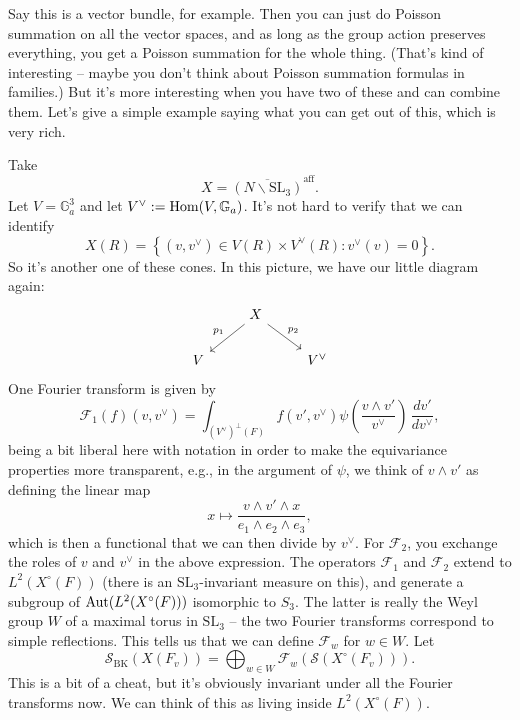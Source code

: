 \documentclass[reqno]{amsart} 
\numberwithin{theorem}{section}
\numberwithin{equation}{section}
\numberwithin{exercise}{section}
\begin{document}
Say this is a vector bundle, for example.  Then you can just do Poisson summation on all the vector spaces, and as long as the group action preserves everything, you get a Poisson summation for the whole thing.  (That's kind of interesting -- maybe you don't think about Poisson summation formulas in families.)  But it's more interesting when you have two of these and can combine them.  Let's give a simple example saying what you can get out of this, which is very rich.

\begin{example}
   Take
   \begin{equation*}
    X = \overline{(N \backslash \mathrm{SL}_3)}^{\mathrm{aff}}.
  \end{equation*}
  Let $V = \mathbb{G}_a^3$ and let $V^\vee := \operatorname{Hom}(V, \mathbb{G}_a)$.  It's not hard to verify that we can identify
  \begin{equation*}
    X(R) = \left\{(v, v^\vee) \in V(R) \times V^\vee(R) : v^\vee(v) = 0 \right\}.
  \end{equation*}
  So it's another one of these cones.  In this picture, we have our little diagram again:
  \begin{equation*}
    \begin{tikzcd}
      & X \arrow[dl, "p_1"'] \arrow[dr, "p_2"] & \\
      V & & V^\vee
    \end{tikzcd}
  \end{equation*}
  One Fourier transform is given by
  \begin{equation*}
    \mathcal{F}_1(f)(v, v^\vee) = \int_{(V^\vee)^{\perp}(F)} f(v ', v^\vee)
    \psi \left( \frac{v \wedge v '}{v^\vee} \right)
    \, \frac{d v'}{d v^\vee},
  \end{equation*}
  being a bit liberal here with notation in order to make the equivariance properties more transparent, e.g., in the argument of $\psi$, we think of $v \wedge v '$ as defining the linear map
  \begin{equation*}
    x \mapsto \frac{v \wedge v ' \wedge x}{e_1 \wedge e_2 \wedge e_3},
  \end{equation*}
  which is then a functional that we can then divide by $v^\vee$.  For $\mathcal{F}_2$, you exchange the roles of $v$ and $v^\vee$ in the above expression.  The operators $\mathcal{F}_1$ and $\mathcal{F}_2$ extend to $L^2(X^\circ(F))$ (there is an $\mathrm{SL}_3$-invariant measure on this), and generate a subgroup of $\operatorname{Aut}(L^2(X^{\circ}(F)))$ isomorphic to $S_3$.  The latter is really the Weyl group $W$ of a maximal torus in $\mathrm{SL}_3$ -- the two Fourier transforms correspond to simple reflections.  This tells us that we can define $\mathcal{F}_w$ for $w \in W$.  Let
  \begin{equation*}
    \mathcal{S}_{\mathrm{B K}}(X(F_v)) = \bigoplus_{w \in W}
    \mathcal{F}_w(\mathcal{S}(X^{\circ}(F_v))).
  \end{equation*}
  This is a bit of a cheat, but it's obviously invariant under all the Fourier transforms now.  We can think of this as living inside $L^2(X^{\circ}(F))$.


\end{example}
\end{document}
